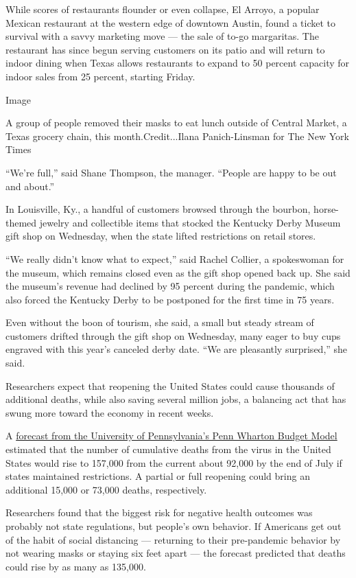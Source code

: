 While scores of restaurants flounder or even collapse, El Arroyo, a
popular Mexican restaurant at the western edge of downtown Austin, found
a ticket to survival with a savvy marketing move --- the sale of to-go
margaritas. The restaurant has since begun serving customers on its
patio and will return to indoor dining when Texas allows restaurants to
expand to 50 percent capacity for indoor sales from 25 percent, starting
Friday.

Image

A group of people removed their masks to eat lunch outside of Central
Market, a Texas grocery chain, this month.Credit...Ilana Panich-Linsman
for The New York Times

``We're full,'' said Shane Thompson, the manager. ``People are happy to
be out and about.''

In Louisville, Ky., a handful of customers browsed through the bourbon,
horse-themed jewelry and collectible items that stocked the Kentucky
Derby Museum gift shop on Wednesday, when the state lifted restrictions
on retail stores.

``We really didn't know what to expect,'' said Rachel Collier, a
spokeswoman for the museum, which remains closed even as the gift shop
opened back up. She said the museum's revenue had declined by 95 percent
during the pandemic, which also forced the Kentucky Derby to be
postponed for the first time in 75 years.

Even without the boon of tourism, she said, a small but steady stream of
customers drifted through the gift shop on Wednesday, many eager to buy
cups engraved with this year's canceled derby date. ``We are pleasantly
surprised,'' she said.

Researchers expect that reopening the United States could cause
thousands of additional deaths, while also saving several million jobs,
a balancing act that has swung more toward the economy in recent weeks.

A
\href{https://budgetmodel.wharton.upenn.edu/issues/2020/5/1/coronavirus-reopening-simulator}{forecast
from the University of Pennsylvania's Penn Wharton Budget Model}
estimated that the number of cumulative deaths from the virus in the
United States would rise to 157,000 from the current about 92,000 by the
end of July if states maintained restrictions. A partial or full
reopening could bring an additional 15,000 or 73,000 deaths,
respectively.

Researchers found that the biggest risk for negative health outcomes was
probably not state regulations, but people's own behavior. If Americans
get out of the habit of social distancing --- returning to their
pre-pandemic behavior by not wearing masks or staying six feet apart ---
the forecast predicted that deaths could rise by as many as 135,000.


